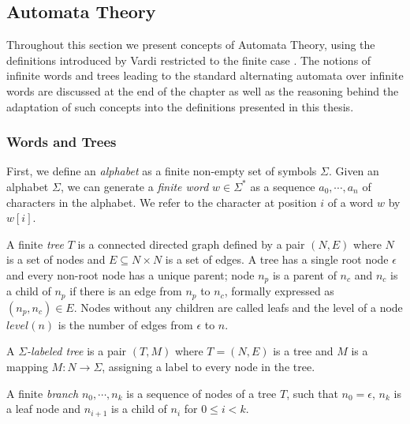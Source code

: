 \subsection{Automata Theory }

Throughout this section we present concepts of Automata Theory, using the definitions introduced by Vardi restricted to the finite case \cite{vardi97a}. The notions of infinite words and trees leading to the standard alternating automata over infinite words are discussed at the end of the chapter as well as the reasoning behind the adaptation of such concepts into the definitions presented in this thesis. 

\subsubsection{Words and Trees}

First, we define an \emph{alphabet} as a finite non-empty set of symbols $\Sigma$. Given an alphabet $\Sigma$, we can generate a \emph{finite word} $w\in\Sigma^*$ as a sequence $a_0,\cdots , a_n$ of characters in the alphabet. We refer to the character at position $i$ of a word $w$ by $w[i]$.


A finite \emph{tree} $T$ is a connected directed graph defined by a pair $(N,E)$ where $N$ is a set of nodes and $E \subseteq N\times N$ is a set of edges. A tree has a single root node $\epsilon$ and every non-root node has a unique parent; node $n_p$ is a parent of $n_c$ and $n_c$ is a child of $n_p$ if there is an edge from $n_p$ to $n_c$, formally expressed as $(n_p,n_c)\in E$. Nodes without any children are called leafs and the level of a node $level(n)$ is the number of edges from $\epsilon$ to $n$. 

\begin{definition}    
    A \emph{$\Sigma$-labeled tree} is a pair $(T,M)$ where $T=(N,E)$ is a tree and $M$ is a mapping $M: N \to \Sigma$, assigning a label to every node in the tree. 
\end{definition}

A finite \emph{branch} $n_0,\cdots,n_k$ is a sequence of nodes of a tree $T$, such that $n_0=\epsilon$, $n_k$ is a leaf node and $n_{i+1}$ is a child of $n_i$ for $0\leq i < k$.


